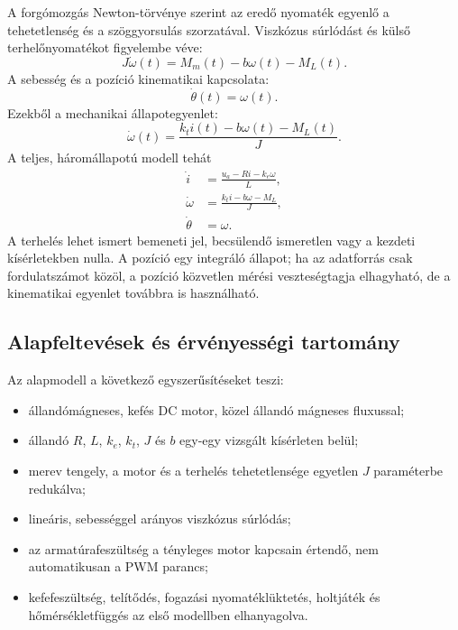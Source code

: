 \documentclass[11pt,a4paper]{article}
\begin{document}
A forgómozgás Newton-törvénye szerint az eredő nyomaték egyenlő a tehetetlenség és a szöggyorsulás szorzatával. Viszkózus súrlódást és külső terhelőnyomatékot figyelembe véve:
\begin{equation}
  J\dot{\omega}(t)=M_m(t)-b\omega(t)-M_L(t).
  \label{eq:mechanics}
\end{equation}
A sebesség és a pozíció kinematikai kapcsolata:
\begin{equation}
  \dot{\theta}(t)=\omega(t).
  \label{eq:position}
\end{equation}
Ezekből a mechanikai állapotegyenlet:
\begin{equation}
  \dot{\omega}(t)=\frac{k_t i(t)-b\omega(t)-M_L(t)}{J}.
  \label{eq:omegadot}
\end{equation}
A teljes, háromállapotú modell tehát
\begin{equation}
\boxed{
\begin{aligned}
  \dot{i} &= \frac{u_a-Ri-k_e\omega}{L},\\
  \dot{\omega} &= \frac{k_t i-b\omega-M_L}{J},\\
  \dot{\theta} &= \omega.
\end{aligned}}
\label{eq:fullmodel}
\end{equation}
A terhelés lehet ismert bemeneti jel, becsülendő ismeretlen vagy a kezdeti kísérletekben nulla. A pozíció egy integráló állapot; ha az adatforrás csak fordulatszámot közöl, a pozíció közvetlen mérési veszteségtagja elhagyható, de a kinematikai egyenlet továbbra is használható.

\subsection{Alapfeltevések és érvényességi tartomány}

Az alapmodell a következő egyszerűsítéseket teszi:

\begin{itemize}
  \item állandómágneses, kefés DC motor, közel állandó mágneses fluxussal;
  \item állandó $R$, $L$, $k_e$, $k_t$, $J$ és $b$ egy-egy vizsgált kísérleten belül;
  \item merev tengely, a motor és a terhelés tehetetlensége egyetlen $J$ paraméterbe redukálva;
  \item lineáris, sebességgel arányos viszkózus súrlódás;
  \item az armatúrafeszültség a tényleges motor kapcsain értendő, nem automatikusan a PWM parancs;
  \item kefefeszültség, telítődés, fogazási nyomatéklüktetés, holtjáték és hőmérsékletfüggés az első modellben elhanyagolva.
\end{itemize}
\end{document}
